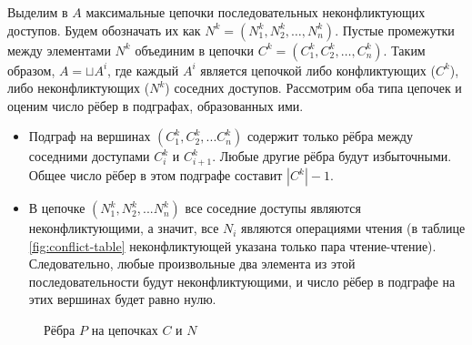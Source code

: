 Выделим в $A$ максимальные цепочки последовательных неконфликтующих доступов. Будем обозначать их как $N^k = (N^k_1, N^k_2, \ldots, N^k_n)$. Пустые промежутки между элементами $N^k$ объединим в цепочки $C^k = (C^k_1, C^k_2, \ldots, C^k_n)$. Таким образом, $A = \sqcup A^i$, где каждый $A^i$ является цепочкой либо конфликтующих ($C^k$), либо неконфликтующих ($N^k$) соседних доступов. Рассмотрим оба типа цепочек и оценим число рёбер в подграфах, образованных ими.

\begin{itemize}
    \item Подграф на вершинах $(C^k_1, C^k_2, ... C^k_n)$ содержит только рёбра между соседними доступами $C^k_i$ и $C^k_{i+1}$. Любые другие рёбра будут избыточными. Общее число рёбер в этом подграфе составит $|C^k| - 1$.
    \item В цепочке $(N^k_1, N^k_2, ... N^k_n)$ все соседние доступы являются неконфликтующими, а значит, все $N_i$ являются операциями чтения (в таблице \ref{fig:conflict-table} неконфликтующей указана только пара чтение-чтение). Следовательно, любые произвольные два элемента из этой последовательности будут неконфликтующими, и число рёбер в подграфе на этих вершинах будет равно нулю.
\end{itemize}

\begin{figure}[H]
    \centering
    \caption{Рёбра $P$ на цепочках $C$ и $N$}
\end{figure}

